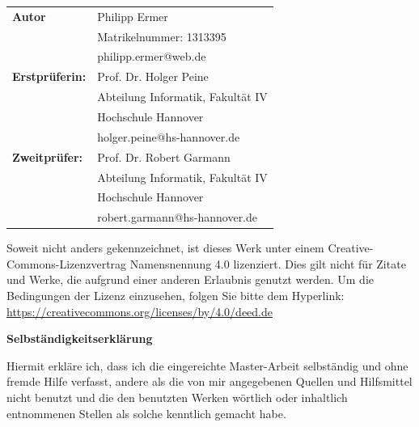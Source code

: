 \documentclass[fontsize=12pt,paper=a4,twoside=semi,parskip=half-,headsepline,headinclude]{scrreprt}
\begin{document}
\vspace*{-3cm}


\newpage 
\thispagestyle{empty}
\quad 


  \newpage \thispagestyle{empty}
 \begin{tabular}{ll}
{\bfseries\sffamily Autor} &  Philipp Ermer \\ 
            & Matrikelnummer: 1313395 \\
            & philipp.ermer@web.de \\[5ex]
{\bfseries\sffamily Erstprüferin:} & Prof. Dr. Holger Peine \\
          & Abteilung Informatik, Fakultät IV \\
         & Hochschule Hannover \\
        & holger.peine@hs-hannover.de \\[5ex]
{\bfseries\sffamily Zweitprüfer:} &Prof. Dr. Robert Garmann \\
          & Abteilung Informatik, Fakultät IV \\
         & Hochschule Hannover \\
        & robert.garmann@hs-hannover.de
\end{tabular}

\vfill

Soweit nicht anders gekennzeichnet, ist dieses Werk unter einem
Creative-Commons-Lizenzvertrag Namensnennung 4.0 lizenziert.
Dies gilt nicht für Zitate und Werke, die aufgrund einer anderen Erlaubnis
genutzt werden.
Um die Bedingungen der Lizenz einzusehen, folgen Sie bitte dem Hyperlink:\\
\url{https://creativecommons.org/licenses/by/4.0/deed.de}

\vfill

\begin{center} \sffamily\bfseries Selbständigkeitserklärung \end{center}

Hiermit erkläre ich, dass ich die eingereichte Master-Arbeit
selbständig und ohne fremde Hilfe verfasst, andere als die von mir angegebenen Quellen
und Hilfsmittel nicht benutzt und die den benutzten Werken wörtlich oder
inhaltlich entnommenen Stellen als solche kenntlich gemacht habe. 
\vspace*{7ex}
\end{document}
